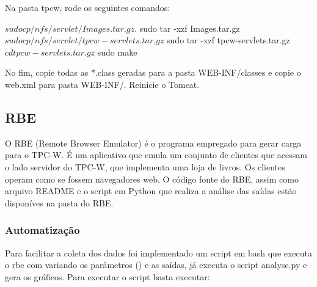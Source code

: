 \documentclass[a4paper,10pt]{article}
\begin{document}
        Na pasta tpcw, rode os seguintes comandos:
        \begin{spverbatim}
            $ sudo cp /nfs/servlet/Images.tar.gz .
            $ sudo tar -xzf Images.tar.gz
            $ sudo cp /nfs/servlet/tpcw-servlets.tar.gz
            $ sudo tar -xzf tpcw-servlets.tar.gz
            $ cd tpcw-servlets.tar.gz
            $ sudo make
        \end{spverbatim}
        
        No fim, copie todas as *.class geradas para a pasta WEB-INF/classes e copie o web.xml para pasta WEB-INF/. Reinicie o Tomcat.
        
       \subsection{RBE}
        O RBE (Remote Browser Emulator) é o programa empregado para gerar carga para o TPC-W. É um aplicativo que emula um conjunto de clientes que acessam o lado servidor do TPC-W, que implementa uma loja de livros. Os clientes operam como se fossem navegadores web.
        O código fonte do RBE, assim como arquivo README e o script em Python que realiza a análise das saídas estão disponíves na pasta do RBE.
        
        \subsubsection{Automatização}
        Para facilitar a coleta dos dados foi implementado um script em bash que executa o rbe com variando os parâmetros () e as saídas, já executa o script analyse.py e gera os gráficos.
        Para executar o script basta executar:
        
        
        
    
\end{document}
